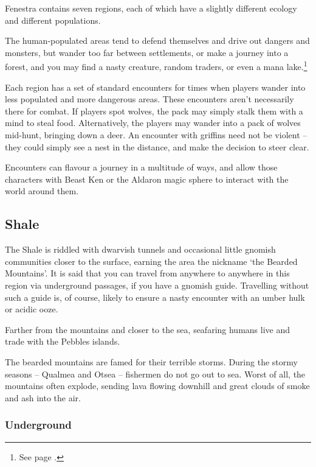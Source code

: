 \begin{multicols}{2}

\noindent
Fenestra contains seven regions, each of which have a slightly different ecology and different populations.

The human-populated areas tend to defend themselves and drive out dangers and monsters, but wander too far between settlements, or make a journey into a forest, and you may find a nasty creature, random traders, or even a mana lake.\footnote{See page \pageref{mana_lake}.}

Each region has a set of standard encounters for times when players wander into less populated and more dangerous areas.  These encounters aren't necessarily there for combat.  If players spot wolves, the pack may simply stalk them with a mind to steal food.  Alternatively, the players may wander into a pack of wolves mid-hunt, bringing down a deer.  An encounter with griffins need not be violent -- they could simply see a nest in the distance, and make the decision to steer clear.

Encounters can flavour a journey in a multitude of ways, and allow those characters with Beast Ken or the Aldaron magic sphere to interact with the world around them.

\subsection{Shale}


The Shale is riddled with dwarvish tunnels and occasional little gnomish communities closer to the surface, earning the area the nickname `the Bearded Mountains'.
It is said that you can travel from anywhere to anywhere in this region via underground passages, if you have a gnomish guide.
Travelling without such a guide is, of course, likely to ensure a nasty encounter with an umber hulk or acidic ooze.

Farther from the mountains and closer to the sea, seafaring humans live and trade with the Pebbles islands.

The bearded mountains are famed for their terrible storms.
During the stormy seasons -- Qualmea and Otsea -- fishermen do not go out to sea.
Worst of all, the mountains often explode, sending lava flowing downhill and great clouds of smoke and ash into the air.

\subsubsection{Underground}


\end{multicols}
